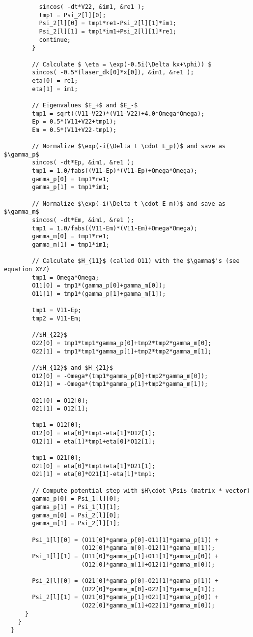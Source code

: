 \documentclass[12pt]{article}
\begin{document}
\begin{verbatim}
          sincos( -dt*V22, &im1, &re1 );
          tmp1 = Psi_2[l][0];
          Psi_2[l][0] = tmp1*re1-Psi_2[l][1]*im1;
          Psi_2[l][1] = tmp1*im1+Psi_2[l][1]*re1;
          continue;
        }

        // Calculate $ \eta = \exp(-0.5i(\Delta kx+\phi)) $
        sincos( -0.5*(laser_dk[0]*x[0]), &im1, &re1 );
        eta[0] = re1;
        eta[1] = im1;

        // Eigenvalues $E_+$ and $E_-$
        tmp1 = sqrt((V11-V22)*(V11-V22)+4.0*Omega*Omega);
        Ep = 0.5*(V11+V22+tmp1);
        Em = 0.5*(V11+V22-tmp1);

        // Normalize $\exp(-i(\Delta t \cdot E_p))$ and save as $\gamma_p$
        sincos( -dt*Ep, &im1, &re1 );
        tmp1 = 1.0/fabs((V11-Ep)*(V11-Ep)+Omega*Omega);
        gamma_p[0] = tmp1*re1;
        gamma_p[1] = tmp1*im1;

        // Normalize $\exp(-i(\Delta t \cdot E_m))$ and save as $\gamma_m$
        sincos( -dt*Em, &im1, &re1 );
        tmp1 = 1.0/fabs((V11-Em)*(V11-Em)+Omega*Omega);
        gamma_m[0] = tmp1*re1;
        gamma_m[1] = tmp1*im1;

        // Calculate $H_{11}$ (called O11) with the $\gamma$'s (see equation XYZ)
        tmp1 = Omega*Omega;
        O11[0] = tmp1*(gamma_p[0]+gamma_m[0]);
        O11[1] = tmp1*(gamma_p[1]+gamma_m[1]);

        tmp1 = V11-Ep;
        tmp2 = V11-Em;

        //$H_{22}$
        O22[0] = tmp1*tmp1*gamma_p[0]+tmp2*tmp2*gamma_m[0];
        O22[1] = tmp1*tmp1*gamma_p[1]+tmp2*tmp2*gamma_m[1];

        //$H_{12}$ and $H_{21}$
        O12[0] = -Omega*(tmp1*gamma_p[0]+tmp2*gamma_m[0]);
        O12[1] = -Omega*(tmp1*gamma_p[1]+tmp2*gamma_m[1]);

        O21[0] = O12[0];
        O21[1] = O12[1];

        tmp1 = O12[0];
        O12[0] = eta[0]*tmp1-eta[1]*O12[1];
        O12[1] = eta[1]*tmp1+eta[0]*O12[1];

        tmp1 = O21[0];
        O21[0] = eta[0]*tmp1+eta[1]*O21[1];
        O21[1] = eta[0]*O21[1]-eta[1]*tmp1;

        // Compute potential step with $H\cdot \Psi$ (matrix * vector)
        gamma_p[0] = Psi_1[l][0];
        gamma_p[1] = Psi_1[l][1];
        gamma_m[0] = Psi_2[l][0];
        gamma_m[1] = Psi_2[l][1];

        Psi_1[l][0] = (O11[0]*gamma_p[0]-O11[1]*gamma_p[1]) + 
                      (O12[0]*gamma_m[0]-O12[1]*gamma_m[1]);
        Psi_1[l][1] = (O11[0]*gamma_p[1]+O11[1]*gamma_p[0]) + 
                      (O12[0]*gamma_m[1]+O12[1]*gamma_m[0]);

        Psi_2[l][0] = (O21[0]*gamma_p[0]-O21[1]*gamma_p[1]) + 
                      (O22[0]*gamma_m[0]-O22[1]*gamma_m[1]);
        Psi_2[l][1] = (O21[0]*gamma_p[1]+O21[1]*gamma_p[0]) + 
                      (O22[0]*gamma_m[1]+O22[1]*gamma_m[0]);
      }
    }
  }
\end{verbatim}
\end{document}
